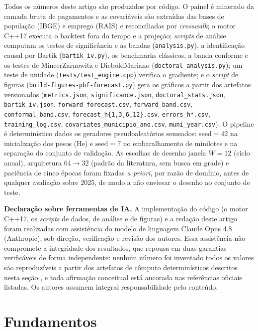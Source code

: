 \documentclass[12pt,a4paper,oneside]{article}
\begin{document}
Todos os números deste artigo são produzidos por código. O painel é
minerado da camada bruta de pagamentos e as covariáveis são extraídas das
bases de população (IBGE) e emprego (RAIS) e reconciliadas por
\emph{crosswalk}; o motor C++17 executa o backtest fora do tempo e a
projeção; \emph{scripts} de análise computam os testes de significância e as
bandas (\texttt{analysis.py}), a identificação causal por Bartik
(\texttt{bartik\_iv.py}), os benchmarks clássicos, a banda conforme e os
testes de Mincer\-Zarnowitz e Diebold\-Mariano (\texttt{doctoral\_analysis.py});
um teste de unidade (\texttt{tests/test\_engine.cpp}) verifica o gradiente; e
o \emph{script} de figuras (\texttt{build-figures-pbf-forecast.py}) gera os
gráficos a partir dos artefatos versionados (\texttt{metrics.json},
\texttt{significance.json}, \texttt{doctoral\_stats.json},
\texttt{bartik\_iv.json}, \texttt{forward\_forecast.csv},
\texttt{forward\_band.csv}, \texttt{conformal\_band.csv},
\texttt{forecast\_h\{1,3,6,12\}.csv}, \texttt{errors\_h*.csv},
\texttt{training\_log.csv}, \texttt{covariates\_municipio\_ano.csv},
\texttt{muni\_year.csv}). O
pipeline é determinístico dados os geradores pseudoaleatórios semeados:
$\text{seed}=42$ na inicialização dos pesos (He) e $\text{seed}=7$ no
embaralhamento de minilotes e na separação do conjunto de validação. As
escolhas de desenho \textemdash{} janela $W=12$ (ciclo anual), arquitetura
$64\to 32$ (padrão da literatura, sem busca em grade) e paciência de cinco
épocas \textemdash{} foram fixadas \emph{a priori}, por razão de domínio,
antes de qualquer avaliação sobre 2025, de modo a não enviesar o desenho ao
conjunto de teste.

\medskip
\noindent\textbf{Declaração sobre ferramentas de IA.} A implementação do
código (o motor C++17, os \emph{scripts} de dados, de análise e de figuras)
e a redação deste artigo foram realizadas com assistência do modelo de
linguagem Claude Opus 4.8 (Anthropic), sob direção, verificação e revisão
dos autores. Essa assistência não compromete a integridade dos resultados,
que repousa em duas garantias verificáveis de forma independente: nenhum
número foi inventado \textemdash{} todos os valores são reproduzíveis a
partir dos artefatos de cômputo determinísticos descritos nesta seção
\textemdash{}, e toda afirmação conceitual está ancorada nas referências
oficiais listadas. Os autores assumem integral responsabilidade pelo
conteúdo.

\section{Fundamentos}
\label{sec:fundamentos}
\end{document}
